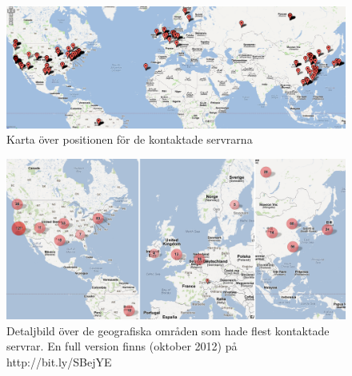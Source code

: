 \documentclass[a4paper]{article}
\begin{document}
\begin{figure}
    \centering
    \includegraphics[keepaspectratio,width=\textwidth]{map}
    \caption{Karta över positionen för de kontaktade servrarna}
    \label{fig:map}
\end{figure}

\begin{figure}
    \centering
    \includegraphics[keepaspectratio,width=\textwidth]{detailmap}
    \caption{Detaljbild över de geografiska områden som hade flest kontaktade servrar. En full version finns (oktober 2012) på http://bit.ly/SBejYE}
    \label{fig:detailmap}
\end{figure}
\end{document}
